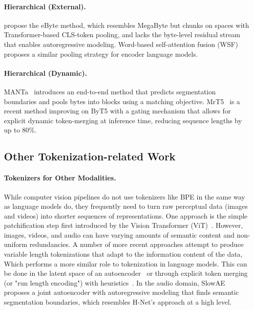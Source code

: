 \paragraph{Hierarchical (External).}
\citet{thawani2023learn} propose the eByte method, which resembles MegaByte but chunks on spaces with Transformer-based CLS-token pooling, and lacks the byte-level residual stream that enables autoregressive modeling.
Word-based self-attention fusion (WSF)~\citep{sreedhar2023local} proposes a similar pooling strategy for encoder language models.

\paragraph{Hierarchical (Dynamic).}
MANTa~\citep{godey2022manta} introduces an end-to-end method that predicts segmentation boundaries and pools bytes into blocks using a matching objective.
MrT5~\citep{kallinimrt5} is a recent method improving on ByT5 with a gating mechanism that allows for explicit dynamic token-merging at inference time, reducing sequence lengths by up to 80\%.

\subsection{Other Tokenization-related Work}
\label{sec:background:other} 

\paragraph{Tokenizers for Other Modalities.}
While computer vision pipelines do not use tokenizers like BPE in the same way as language models do,
they frequently need to turn raw perceptual data (images and videos) into shorter sequences of representations.
One approach is the simple patchification step first introduced by the Vision Transformer (ViT)~\citep{ViT}.
However, images, videos, and audio can have varying amounts of semantic content and non-uniform redundancies.
A number of more recent approaches attempt to produce variable length tokenizations that adapt to the information content of the data,
Which performs a more similar role to tokenization in language models. 
This can be done in the latent space of an autoencoder~\citep{TiTok, ALIT}
or through explicit token merging (or "run length encoding") with heuristics~\citep{ToMe, RLT}.
In the audio domain, SlowAE~\citep{SlowAE} proposes a joint autoencoder with autoregressive modeling that finds semantic segmentation boundaries, which resembles H-Net's approach at a high level.

